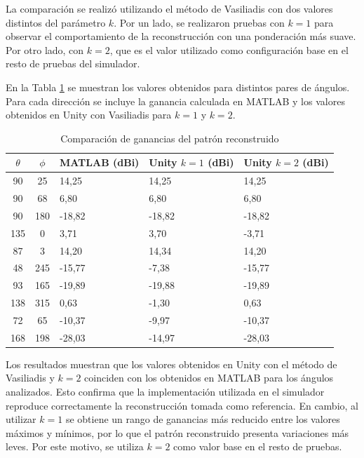 La comparación se realizó utilizando el método de Vasiliadis con dos valores distintos del parámetro $k$. Por un lado, se realizaron pruebas con $k = 1$ para observar el comportamiento de la reconstrucción con una ponderación más suave. Por otro lado, con $k = 2$, que es el valor utilizado como configuración base en el resto de pruebas del simulador.

En la Tabla \ref{tab:comprobacion_patron} se muestran los valores obtenidos para distintos pares de ángulos. Para cada dirección se incluye la ganancia calculada en MATLAB y los valores obtenidos en Unity con Vasiliadis para $k = 1$ y $k = 2$.

\begin{table}[H]
    \centering
    \begin{tabularx}{\textwidth}{@{}ccXXX@{}}
        \toprule
        \textbf{$\theta$} & \textbf{$\phi$} & \textbf{MATLAB (dBi)} & \textbf{Unity $k=1$ (dBi)} & \textbf{Unity $k=2$ (dBi)}\\
        \midrule
        90 & 25 & 14,25 & 14,25 & 14,25 \\
        90 & 68 & 6,80 & 6,80 & 6,80 \\
        90 & 180 & -18,82 & -18,82 & -18,82 \\
        135 & 0 & 3,71 & 3,70 & -3,71 \\
        87 & 3 & 14,20 & 14,34 & 14,20 \\ %
        48 & 245 & -15,77 & -7,38 & -15,77 \\ %
        93 & 165 & -19,89 & -19,88 & -19,89 \\ %
        138 & 315 & 0,63 & -1,30 & 0,63 \\ %
        72 & 65 & -10,37 & -9,97 & -10,37 \\ %
        168 & 198 & -28,03 & -14,97 & -28,03 \\ %
        \bottomrule
    \end{tabularx}
    \caption{Comparación de ganancias del patrón reconstruido}
    \label{tab:comprobacion_patron}
\end{table}

Los resultados muestran que los valores obtenidos en Unity con el método de Vasiliadis y $k = 2$ coinciden con los obtenidos en MATLAB para los ángulos analizados. Esto confirma que la implementación utilizada en el simulador reproduce correctamente la reconstrucción tomada como referencia. En cambio, al utilizar $k = 1$ se obtiene un rango de ganancias más reducido entre los valores máximos y mínimos, por lo que el patrón reconstruido presenta variaciones más leves. Por este motivo, se utiliza $k = 2$ como valor base en el resto de pruebas.

